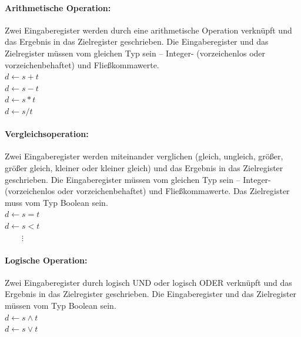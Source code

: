 \documentclass[twoside,a4paper,fleqn,12pt]{article}
\begin{document}
\paragraph{Arithmetische Operation:} Zwei Eingaberegister 
werden durch eine arithmetische Operation verknüpft und das Ergebnis in das Zielregister geschrieben.
Die Eingaberegister und das Zielregister müssen vom gleichen Typ sein -- Integer- (vorzeichenlos oder vorzeichenbehaftet) und Fließkommawerte.
\\\hspace*{1cm}$d \gets s + t$
\\\hspace*{1cm}$d \gets s - t$
\\\hspace*{1cm}$d \gets s * t$
\\\hspace*{1cm}$d \gets s / t$

\paragraph{Vergleichsoperation:} Zwei Eingaberegister 
werden miteinander verglichen (gleich, ungleich, größer, größer gleich, kleiner oder kleiner gleich) und das Ergebnis in das Zielregister geschrieben.
Die Eingaberegister müssen vom gleichen Typ sein -- Integer- (vorzeichenlos oder vorzeichenbehaftet) und Fließkommawerte.
Das Zielregister muss vom Typ Boolean sein.
\\\hspace*{1cm}$d \gets s = t$
\\\hspace*{1cm}$d \gets s < t$
\\\hspace*{1cm}$\phantom{d \gets}\vdots$

\paragraph{Logische Operation:} Zwei Eingaberegister durch logisch UND oder logisch ODER verknüpft und das Ergebnis in das Zielregister geschrieben.
Die Eingaberegister und das Zielregister müssen vom Typ Boolean sein.
\\\hspace*{1cm}$d \gets s \land t$
\\\hspace*{1cm}$d \gets s \lor t$
\end{document}
